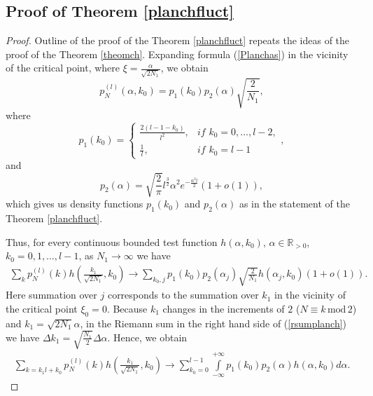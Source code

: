 \documentclass[11pt]{amsart}
\begin{document}
\subsection{Proof of Theorem \ref{planchfluct}}\label{approofplanch}
\begin{proof}
    Outline of the proof of the Theorem \ref{planchfluct} repeats the ideas of the proof of the Theorem \ref{theomch}. Expanding formula (\ref{Planchas}) in the vicinity of the critical point, where $\xi=\frac{\alpha}{\sqrt{2N_1}}$, we obtain
    \begin{equation*}
	p^{(l)}_N(\alpha,k_0)=p_1(k_0)p_2(\alpha)\sqrt{\frac{2}{N_1}},
	\end{equation*}
	where
	\begin{equation*}
	p_1(k_0)=\begin{cases}
	\frac{2(l-1-k_0)}{l^2},& \textit{if $k_0=0,\ldots,l-2$},\\
	\frac{1}{l},& \textit{if $k_0=l-1$}
	\end{cases},
	\end{equation*}
	and
	\begin{equation*}
	p_2(\alpha)=\sqrt{\frac{2}{\pi}}l^{\frac{3}{2}}\alpha^2 e^{-\frac{\alpha^2l}{2}}(1+o(1)),
	\end{equation*}
    which gives us density functions $p_1(k_0)$ and $p_2(\alpha)$ as in the statement of the Theorem \ref{planchfluct}.

    
    Thus, for every continuous bounded test function $h(\alpha,k_0)$, $\alpha\in\mathbb{R}_{>0}$, $k_0=0,1,\ldots,l-1$, as $N_1\to\infty$ we have
    \begin{eqnarray}\label{rsumplanch}
    \sum\limits_{k} p^{(l)}_N(k)h\left(\frac{k_1}{\sqrt{2N_1}},k_0\right)\to\sum\limits_{k_0,j}p_1(k_0)p_2(\alpha_j)\sqrt{\frac{2}{N_1}}h(\alpha_j,k_0)(1+o(1)).\nonumber
    \end{eqnarray}
    Here summation over $j$ corresponds to the summation over $k_1$ in the vicinity of the critical point $\xi_0=0$. Because $k_1$ changes in the increments of $2$ ($N\equiv k\,\mathrm{mod}\, 2$) and $k_1=\sqrt{2N_1}\alpha$, in the Riemann sum in the right hand side of (\ref{rsumplanch}) we have $\Delta k_1=\sqrt{\frac{N_1}{2}}\Delta\alpha$. Hence, we obtain
    \begin{eqnarray*}
    \sum\limits_{k=k_1l+k_0} p^{(l)}_N(k)h\left(\frac{k_1}{\sqrt{2N_1}},k_0\right)\to\sum\limits_{k_0=0}^{l-1}\int\limits_{-\infty}^{+\infty}p_1(k_0)p_2(\alpha)h(\alpha,k_0)d\alpha.
    \end{eqnarray*}
\end{proof}
\end{document}
